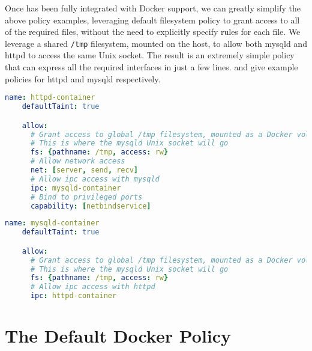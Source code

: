 Once \bpfcontain{} has been fully integrated with Docker support, we can greatly simplify
the above policy examples, leveraging default filesystem policy to grant access to all of
the required files, without the need to explicitly specify rules for each file. We
leverage a shared \texttt{/tmp} filesystem, mounted on the host, to allow both mysqld and
httpd to access the same Unix socket. The result is an extremely simple policy that can
express all the required interfaces in just a few lines. 
and  give example policies for httpd and mysqld
respectively.

\begin{lstlisting}[language=yaml, gobble=4, float=false, caption={[A simplified \bpfcontain{} policy for Apache httpd]
  A simplified \bpfcontain{} policy for Apache httpd running in a Docker container,
  leveraging future support for automatic filesystem policy.
  %\todo{Describe this}
}, label={lst:bpfcontain-httpd-next}]
    name: httpd-container
    defaultTaint: true

    allow:
      # Grant access to global /tmp filesystem, mounted as a Docker volume
      # This is where the mysqld Unix socket will go
      fs: {pathname: /tmp, access: rw}
      # Allow network access
      net: [server, send, recv]
      # Allow ipc access with mysqld
      ipc: mysqld-container
      # Bind to privileged ports
      capability: [netbindservice]
\end{lstlisting}

\begin{lstlisting}[language=yaml, gobble=4, float=false, caption={[A simplified \bpfcontain{} policy for MySQL]
  A simplified \bpfcontain{} policy for MySQL running in a Docker container, leveraging
  future support for automatic filesystem policy.
  %\todo{Describe this}
}, label={lst:bpfcontain-mysqld-next}]
    name: mysqld-container
    defaultTaint: true

    allow:
      # Grant access to global /tmp filesystem, mounted as a Docker volume
      # This is where the mysqld Unix socket will go
      fs: {pathname: /tmp, access: rw}
      # Allow ipc access with httpd
      ipc: httpd-container
\end{lstlisting}


\section{The Default Docker Policy}

